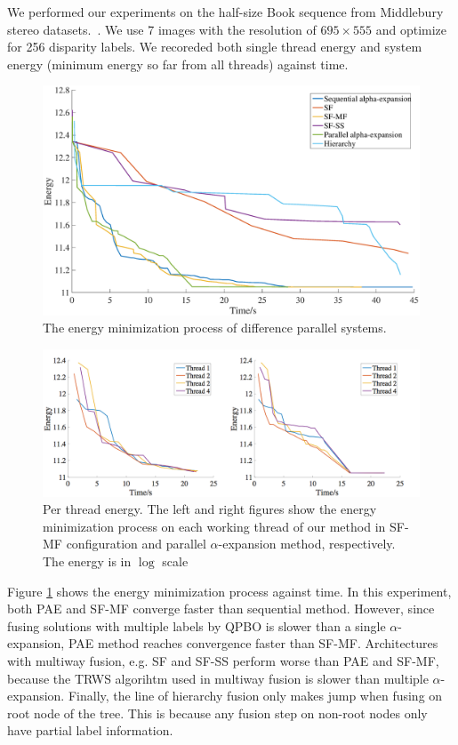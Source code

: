 
We performed our experiments on the half-size Book sequence from Middlebury stereo
datasets.~\cite{middlebury_stereo}. We use 7 images with the
resolution of $695\times555$ and optimize for 256 disparity labels. We
recoreded both single thread energy and system energy (minimum energy
so far from all threads) against time.

\begin{figure}[tb]
  \includegraphics[width=\columnwidth]{figure/stereo_global.eps}
  \caption{The energy minimization process of difference parallel systems.}
  \label{fig:stereo_global}
\end{figure}

\begin{figure}[tb]
  \includegraphics[width=\columnwidth]{figure/stereo_threads.png}
  \caption{Per thread energy. The left and right figures show the
    energy minimization process on each working thread of our method
    in SF-MF configuration and parallel $\alpha$-expansion method,
    respectively. The energy is in $\log$ scale}
  \label{fig:stereo_threads}
\end{figure}


Figure \ref{fig:stereo_global} shows the energy minimization process
against time. In this experiment, both PAE and SF-MF converge faster
than sequential method. However, since fusing solutions with multiple
labels by QPBO is slower than a single $\alpha$-expansion, PAE method
reaches convergence faster than SF-MF. Architectures with multiway
fusion, e.g. SF and SF-SS perform worse than PAE and SF-MF, because
the TRWS algorihtm used in multiway fusion is slower than multiple
$\alpha$-expansion. Finally, the line of hierarchy fusion only makes
jump when fusing on root node of the tree. This is because any fusion
step on non-root nodes only have partial label information.

